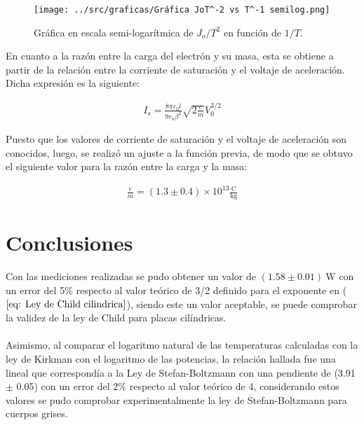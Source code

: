 \documentclass[%
 reprint,
 amsmath,amssymb,
 aps,
]{revtex4-2}
\begin{document}
\begin{figure}[H]
    \centering
    \texttt{[image: ../src/graficas/Gráfica JoT^-2 vs T^-1 semilog.png]}
    \caption{Gráfica en escala semi-logarítmica de $J_{o}/T^{2}$ en función de $1/T$.}
    \label{fig: Grafica Ley de Richardson}
\end{figure}

\vspace{0.2 cm}
En cuanto a la razón entre la carga del electrón y su masa, esta se obtiene a partir de la relación entre la corriente de saturación y el voltaje de aceleración. Dicha expresión es la siguiente:

\begin{align}
    I_{s} = \frac{8\pi \varepsilon_{0}l}{9r_{a}\beta^{2}}\sqrt{2\frac{e}{m}}V_{0}^{3/2}
    \label{11}
\end{align}

\vspace{0.2 cm}
Puesto que los valores de corriente de saturación y el voltaje de aceleración son conocidos, luego, se realizó un ajuste a la función previa, de modo que se obtuvo el siguiente valor para la razón entre la carga y la masa:

\begin{align*}
    \frac{e}{m} = (1.3 \pm 0.4)\times 10^{13} \frac{\text{C}}{\text{kg}}
\end{align*}



\section{Conclusiones}

Con las mediciones realizadas se pudo obtener un valor de $(1.58\pm 0.01)\ \text{W}$ con un error del 5$\%$ respecto al valor teórico de 3/2 definido para el exponente en ($\ref{eq: Ley de Child cilindrica}$), siendo este un valor aceptable, se puede comprobar la validez de la  ley de Child para placas cilíndricas.
\\\\
Asimismo, al comparar el logaritmo natural de las temperaturas calculadas con la ley de Kirkman con el logaritmo de las potencias, la relación hallada fue una lineal que correspondía a la Ley de Stefan-Boltzmann con una pendiente de (3.91 $\pm$ 0.05) con un error del $2\%$ respecto al valor teórico de 4, considerando estos valores se pudo comprobar experimentalmente la ley de Stefan-Boltzmann para cuerpos grises.
\\
\end{document}
